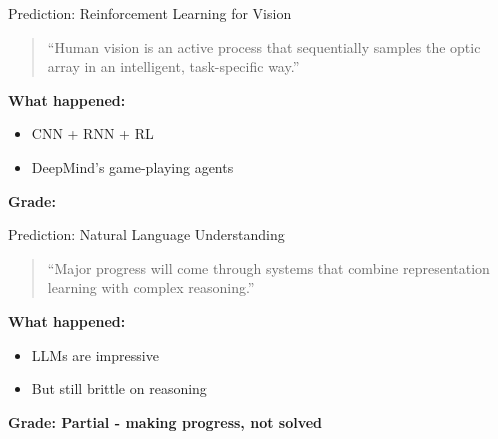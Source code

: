\begin{frame}{Prediction: Reinforcement Learning for Vision}
    \begin{quote}
        ``Human vision is an active process that sequentially samples the optic array in an intelligent, task-specific way.''
    \end{quote}
    
    \vspace{1em}
    \textbf{What happened:}
    \begin{itemize}
        \item CNN + RNN + RL
        \item DeepMind's game-playing agents
    \end{itemize}
    
    \vspace{1em}
    \textbf{Grade: \checkmark}
\end{frame}

\begin{frame}{Prediction: Natural Language Understanding}
    \begin{quote}
        ``Major progress will come through systems that combine representation learning with complex reasoning.''
    \end{quote}
    
    \vspace{1em}
    \textbf{What happened:}
    \begin{itemize}
        \item LLMs are impressive
        \item But still brittle on reasoning
    \end{itemize}
    
    \vspace{1em}
    \textbf{Grade: Partial \checkmark - making progress, not solved}
\end{frame}
